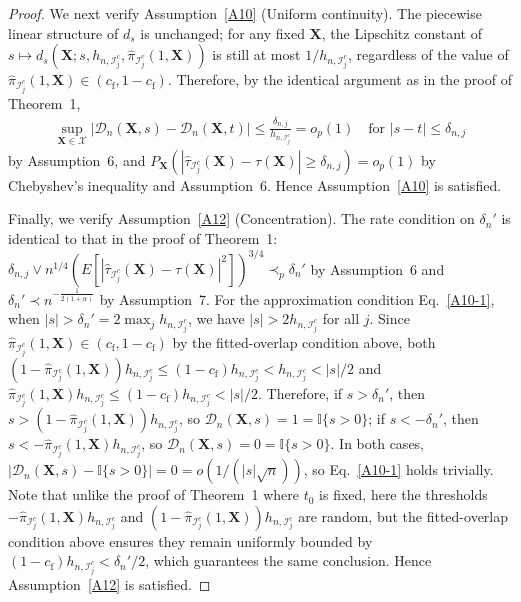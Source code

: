 \documentclass[11pt]{article}
\theoremstyle{referenceplain}
\theoremstyle{referencedefinition}
\theoremstyle{referenceremark}
\begin{document}
\begin{proof}
    We next verify Assumption~\ref{A10} (Uniform continuity). 
    The piecewise linear structure of $d_s$ is unchanged; 
    for any fixed $\mathbf{X}$, the Lipschitz constant of 
    $s\mapsto d_s(\mathbf{X};s,h_{n,\mathcal{I}_j^c},
    \widehat{\pi}_{\mathcal{I}_j^c}(1,\mathbf{X}))$ 
    is still at most $1/h_{n,\mathcal{I}_j^c}$, regardless 
    of the value of $\widehat{\pi}_{\mathcal{I}_j^c}
    (1,\mathbf{X})\in({c_{\mathrm f}},1-{c_{\mathrm f}})$. Therefore, by the identical 
    argument as in the proof of Theorem~1,
    \begin{align*}
        \sup_{\mathbf{X}\in\mathcal{X}}
        |\mathcal{D}_n(\mathbf{X},s)-\mathcal{D}_n(\mathbf{X},t)|
        \leq \frac{{\delta_{n,j}}}{h_{n,\mathcal{I}_j^c}}=o_p(1)
        \quad\text{for }|s-t|\leq{\delta_{n,j}}
    \end{align*}
    by Assumption~6, and 
    $P_{\mathbf{X}}(|\widehat{\tau}_{\mathcal{I}_j^c}(\mathbf{X})
    -\tau(\mathbf{X})|\ge{\delta_{n,j}})=o_p(1)$ 
    by Chebyshev's inequality and Assumption~6. Hence 
    Assumption~\ref{A10} is satisfied.

    Finally, we verify Assumption~\ref{A12} (Concentration). 
    The rate condition on $\delta_n'$ is identical to that 
    in the proof of Theorem~1: 
    ${\delta_{n,j}}\lor n^{1/4}(E[|\widehat{\tau}_{{\mathcal{I}_j^c}}
    (\mathbf{X})-\tau(\mathbf{X})|^2])^{3/4}
    \prec_p \delta_n'$ by Assumption~6 and 
    $\delta_n'\prec n^{-\frac{1}{2(1+\alpha)}}$ 
    by Assumption~7. For the approximation condition 
    Eq.~\eqref{A10-1}, when 
    $|s|>\delta_n'=2\max_j h_{n,\mathcal{I}_j^c}$, we have 
    $|s|>2 h_{n,\mathcal{I}_j^c}$ for all $j$. Since 
    $\widehat{\pi}_{\mathcal{I}_j^c}(1,\mathbf{X})\in({c_{\mathrm f}},1-{c_{\mathrm f}})$ 
    by {the fitted-overlap condition above}, both 
    $(1-\widehat{\pi}_{\mathcal{I}_j^c}(1,\mathbf{X}))
    h_{n,\mathcal{I}_j^c}\leq (1-{c_{\mathrm f}})h_{n,\mathcal{I}_j^c}
    <h_{n,\mathcal{I}_j^c}<|s|/2$ and 
    $\widehat{\pi}_{\mathcal{I}_j^c}(1,\mathbf{X})
    h_{n,\mathcal{I}_j^c}\leq (1-{c_{\mathrm f}})h_{n,\mathcal{I}_j^c}
    <|s|/2$. Therefore, if $s>\delta_n'$, then 
    $s>(1-\widehat{\pi}_{\mathcal{I}_j^c}(1,\mathbf{X}))
    h_{n,\mathcal{I}_j^c}$, so 
    $\mathcal{D}_n(\mathbf{X},s)=1=\mathbb{I}\{s>0\}$; 
    if $s<-\delta_n'$, then 
    $s<-\widehat{\pi}_{\mathcal{I}_j^c}(1,\mathbf{X})
    h_{n,\mathcal{I}_j^c}$, so 
    $\mathcal{D}_n(\mathbf{X},s)=0=\mathbb{I}\{s>0\}$. 
    In both cases, $|\mathcal{D}_n(\mathbf{X},s)
    -\mathbb{I}\{s>0\}|=0=o(1/({|s|}\sqrt{n}))$, 
    so Eq.~\eqref{A10-1} holds trivially. Note that 
    unlike the proof of Theorem~1 where $t_0$ is fixed, 
    here the thresholds 
    $-\widehat{\pi}_{\mathcal{I}_j^c}(1,\mathbf{X})
    h_{n,\mathcal{I}_j^c}$ and 
    $(1-\widehat{\pi}_{\mathcal{I}_j^c}(1,\mathbf{X}))
    h_{n,\mathcal{I}_j^c}$ are random, but the {fitted-overlap condition above} ensures they remain uniformly bounded by 
    $(1-{c_{\mathrm f}})h_{n,\mathcal{I}_j^c}<\delta_n'/2$, which 
    guarantees the same conclusion. Hence 
    Assumption~\ref{A12} is satisfied.


\end{proof}
\end{document}
